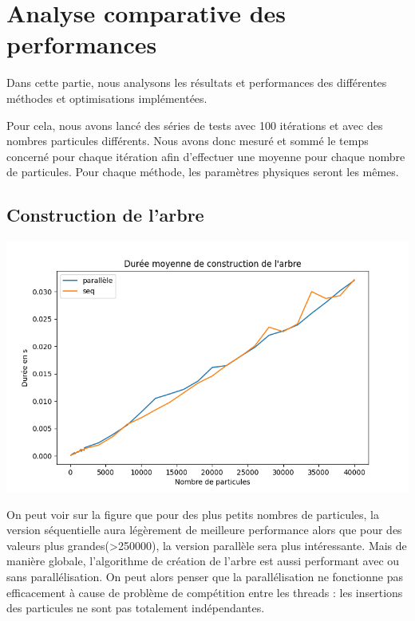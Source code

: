 \chapter{Analyse comparative des  performances}
Dans cette partie, nous analysons les résultats et performances des différentes méthodes et optimisations implémentées.

Pour cela, nous avons lancé des séries de tests avec 100 itérations et avec des nombres particules différents. Nous avons donc mesuré et sommé le temps concerné pour chaque itération afin d'effectuer une moyenne pour chaque nombre de particules. Pour chaque méthode, les paramètres physiques seront les mêmes.

\section{Construction de l'arbre}
\begin{center}
\includegraphics[scale=0.6]{./resultats/tree_comparison.png}
\captionsetup{hypcap=false}
\label{fig9}
\end{center}

On peut voir sur la figure que pour des plus petits nombres de particules, la version séquentielle aura légèrement de meilleure performance alors que pour des valeurs plus grandes(>250000), la version parallèle sera plus intéressante. Mais de manière globale, l'algorithme de création de l'arbre est aussi performant avec ou sans parallélisation. On peut alors penser que la parallélisation ne fonctionne pas efficacement à cause de problème de compétition entre les threads : les insertions des particules ne sont pas totalement indépendantes.


